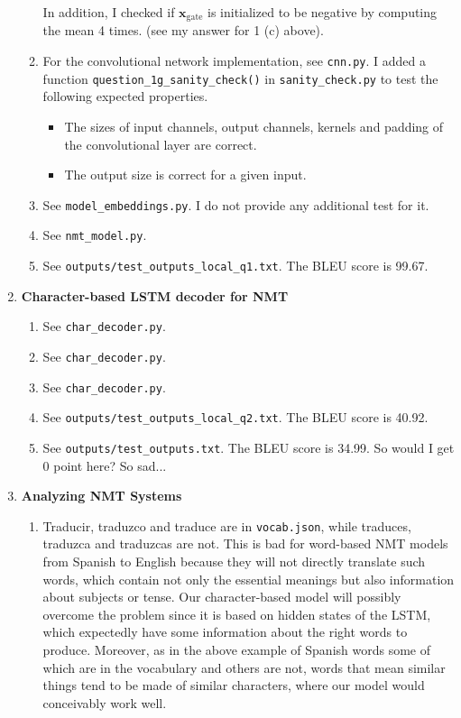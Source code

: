 \documentclass[12pt]{article}
\begin{document}
\begin{enumerate}[label=\textbf{\arabic*.}]
\begin{enumerate}[label=(\alph*)]
    In addition, I checked if $\bm{x}_\text{gate}$ is initialized to be negative by computing the mean 4 times. (see my answer for 1 (c) above).
    \item For the convolutional network implementation, see \texttt{cnn.py}. I added a function \texttt{question\_1g\_sanity\_check()} in \texttt{sanity\_check.py} to test the following expected properties.
    \begin{itemize}
      \item The sizes of input channels, output channels, kernels and padding of the convolutional layer are correct.
      \item The output size is correct for a given input.
    \end{itemize}
    \item See \texttt{model\_embeddings.py}. I do not provide any additional test for it.
    \item See \texttt{nmt\_model.py}.
    \item See \texttt{outputs/test\_outputs\_local\_q1.txt}. The BLEU score is 99.67.
  \end{enumerate}
  \item \textbf{Character-based LSTM decoder for NMT}
  \begin{enumerate}[label=(\alph*)]
    \item See \texttt{char\_decoder.py}.
    \item See \texttt{char\_decoder.py}.
    \item See \texttt{char\_decoder.py}.
    \item See \texttt{outputs/test\_outputs\_local\_q2.txt}. The BLEU score is 40.92.
    \item See \texttt{outputs/test\_outputs.txt}. The BLEU score is 34.99. So would I get 0 point here? So sad...
  \end{enumerate}
  \item \textbf{Analyzing NMT Systems}
  \begin{enumerate}[label=(\alph*)]
    \item Traducir, traduzco and traduce are in \texttt{vocab.json}, while traduces, traduzca and traduzcas are not. This is bad for word-based NMT models from Spanish to English because they will not directly translate such words, which contain not only the essential meanings but also information about subjects or tense. Our character-based model will possibly overcome the problem since it is based on hidden states of the LSTM, which expectedly have some information about the right words to produce. Moreover, as in the above example of Spanish words some of which are in the vocabulary and others are not, words that mean similar things tend to be made of similar characters, where our model would conceivably work well.

\end{enumerate}
\end{enumerate}
\end{document}
